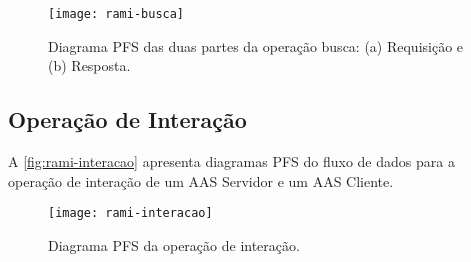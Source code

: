 	\begin{figure}[htb]
		\centering
		\caption{Diagrama PFS das duas partes da operação busca: (a) Requisição e (b) Resposta.  }
		\label{fig:rami-busca}
		\texttt{[image: rami-busca]}
	\end{figure}

\newpage
\subsection{ Operação de Interação }

	A \autoref{fig:rami-interacao} apresenta diagramas PFS do fluxo de dados para a operação de interação de um AAS Servidor e um AAS Cliente.
	
	\begin{figure}[htb]
		\centering
		\caption{Diagrama PFS da operação de interação.}
		\label{fig:rami-interacao}
		\texttt{[image: rami-interacao]}
	\end{figure}
	
